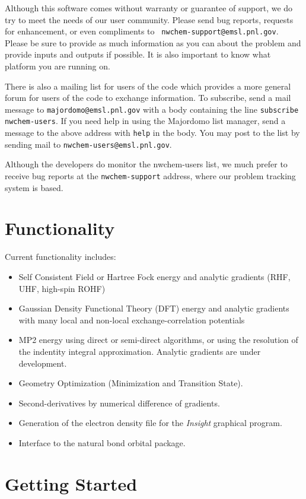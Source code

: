 Although this software comes without warranty or guarantee of support,
we do try to meet the needs of our user community.  Please send bug
reports, requests for enhancement, or even compliments to {\tt
nwchem-support@emsl.pnl.gov}.
Please be sure to provide as much information as you can about the
problem and provide inputs and outputs if possible.  It is also
important to know what platform you are running on.

There is also a mailing list for users of the code which provides a
more general forum for users of the code to exchange information.
To subscribe, send a mail message to {\tt majordomo@emsl.pnl.gov} with
a body containing the line {\tt subscribe nwchem-users}.  If you need
help in using the Majordomo list manager, send a message to the above
address with {\tt help} in the body.  You may post to the list by
sending mail to {\tt nwchem-users@emsl.pnl.gov}.

Although the developers do monitor the nwchem-users list, we much
prefer to receive bug reports at the {\tt nwchem-support} address,
where our problem tracking system is based.

\section{Functionality}

Current functionality includes:
\begin{itemize}
\item Self Consistent Field or Hartree Fock energy and analytic
  gradients (RHF, UHF, high-spin ROHF)
\item Gaussian Density Functional Theory (DFT) energy and analytic
  gradients with many local and
      non-local exchange-correlation potentials
\item MP2 energy using direct or semi-direct algorithms, or using the
  resolution of the indentity integral approximation.  Analytic
  gradients are under development.
\item Geometry Optimization (Minimization and Transition State).
\item Second-derivatives by numerical difference of gradients.
\item Generation of the electron density file for the {\em Insight}
      graphical program.
\item Interface to the natural bond orbital package.
\end{itemize}

\section{Getting Started}
\label{sec:getstart}


